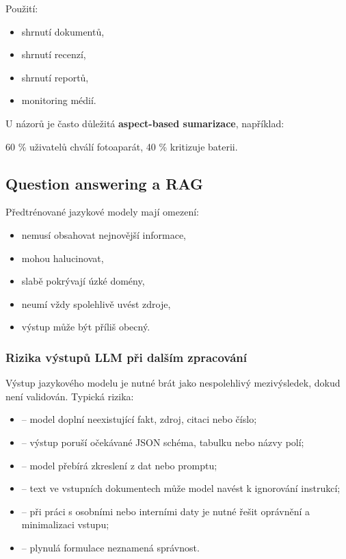 Použití:
\begin{itemize}
    \item shrnutí dokumentů,
    \item shrnutí recenzí,
    \item shrnutí reportů,
    \item monitoring médií.
\end{itemize}

U názorů je často důležitá \textbf{aspect-based sumarizace}, například:
\begin{center}
60 \% uživatelů chválí fotoaparát, 40 \% kritizuje baterii.
\end{center}

\subsection{Question answering a RAG}

Předtrénované jazykové modely mají omezení:
\begin{itemize}
    \item nemusí obsahovat nejnovější informace,
    \item mohou halucinovat,
    \item slabě pokrývají úzké domény,
    \item neumí vždy spolehlivě uvést zdroje,
    \item výstup může být příliš obecný.
\end{itemize}

\subsubsection{Rizika výstupů LLM při dalším zpracování}
Výstup jazykového modelu je nutné brát jako nespolehlivý mezivýsledek, dokud není validován. Typická
rizika:
\begin{itemize}
    \item {} -- model doplní neexistující fakt, zdroj, citaci nebo číslo;
    \item {} -- výstup poruší očekávané JSON schéma, tabulku nebo názvy polí;
    \item {} -- model přebírá zkreslení z dat nebo promptu;
    \item {} -- text ve vstupních dokumentech může model navést k ignorování instrukcí;
    \item {} -- při práci s osobními nebo interními daty je nutné řešit oprávnění
    a minimalizaci vstupu;
    \item {} -- plynulá formulace neznamená správnost.
\end{itemize}

